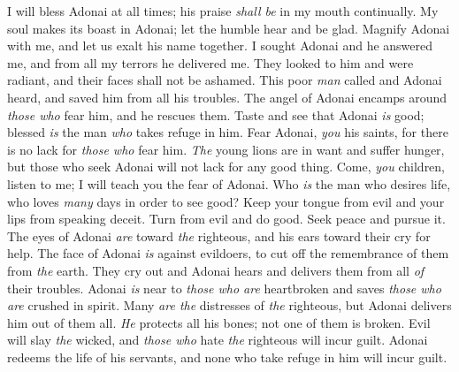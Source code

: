 \begin{biblechapter} %
 I will bless Adonai at all times; 
his praise \textit{shall be} in my mouth continually.
\verse My soul makes its boast in Adonai; 
let the humble hear and be glad.
\verse Magnify Adonai with me, 
and let us exalt his name together.
\verse I sought Adonai and he answered me, 
and from all my terrors he delivered me.
\verse They looked to him and were radiant, 
and their faces shall not be ashamed.
\verse This poor \textit{man} called and Adonai heard, 
and saved him from all his troubles.
\verse The angel of Adonai encamps 
around \textit{those who} fear him, 
and he rescues them.
\verse Taste and see that Adonai \textit{is} good; 
blessed \textit{is} the man \textit{who} takes refuge in him.
\verse Fear Adonai, \textit{you} his saints, 
for there is no lack for \textit{those who} fear him.
\verse \textit{The} young lions are in want and suffer hunger, 
but those who seek Adonai will not lack for any good thing.
\verse Come, \textit{you} children, listen to me; 
I will teach you the fear of Adonai.
\verse Who \textit{is} the man who desires life, 
who loves \textit{many} days in order to see good?
\verse Keep your tongue from evil 
and your lips from speaking deceit.
\verse Turn from evil and do good. 
Seek peace and pursue it.
\verse The eyes of Adonai \textit{are} toward \textit{the} righteous, 
and his ears toward their cry for help.
\verse The face of Adonai \textit{is} against evildoers, 
to cut off the remembrance of them from \textit{the} earth.
\verse They cry out and Adonai hears 
and delivers them from all \textit{of} their troubles.
\verse Adonai \textit{is} near to \textit{those who are} heartbroken 
and saves \textit{those who are} crushed in spirit.
\verse Many \textit{are the} distresses of \textit{the} righteous, 
but Adonai delivers him out of them all.
\verse \textit{He} protects all his bones; 
not one of them is broken.
\verse Evil will slay \textit{the} wicked, 
and \textit{those who} hate \textit{the} righteous will incur guilt.
\verse Adonai redeems the life of his servants, 
and none who take refuge in him will incur guilt.
\end{biblechapter}

